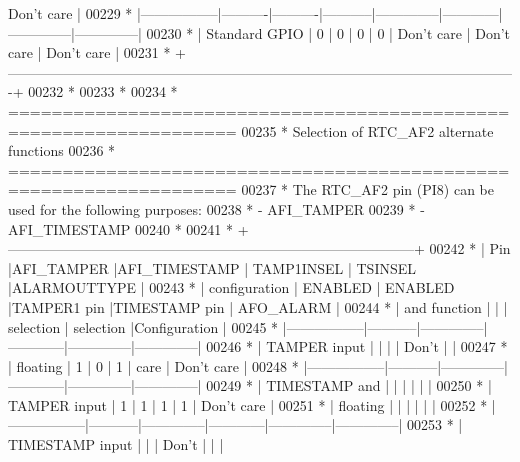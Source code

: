 \begin{DoxyCode}
{       Don't care  |}
00229 \textcolor{comment}{  *
       |-----------------|----------|----------|-----------|--------------|------------|--------------|--------------|}
00230 \textcolor{comment}{  * |  Standard GPIO  |     0    |    0     |     0     |      0       | Don't care |  Don't care  | 
       Don't care  |}
00231 \textcolor{comment}{  *
       +-------------------------------------------------------------------------------------------------------------+}
00232 \textcolor{comment}{  *}
00233 \textcolor{comment}{  *}
00234 \textcolor{comment}{  *          ===================================================================}
00235 \textcolor{comment}{  *                            Selection of RTC\_AF2 alternate functions}
00236 \textcolor{comment}{  *          ===================================================================}
00237 \textcolor{comment}{  *          The RTC\_AF2 pin (PI8) can be used for the following purposes:}
00238 \textcolor{comment}{  *            - AFI\_TAMPER}
00239 \textcolor{comment}{  *            - AFI\_TIMESTAMP}
00240 \textcolor{comment}{  *}
00241 \textcolor{comment}{  * +---------------------------------------------------------------------------------------+}
00242 \textcolor{comment}{  * |     Pin         |AFI\_TAMPER |AFI\_TIMESTAMP | TAMP1INSEL |   TSINSEL    |ALARMOUTTYPE  |}
00243 \textcolor{comment}{  * |  configuration  |  ENABLED  |   ENABLED    |TAMPER1 pin |TIMESTAMP pin |  AFO\_ALARM   |}
00244 \textcolor{comment}{  * |  and function   |           |              | selection  |  selection   |Configuration |}
00245 \textcolor{comment}{  * |-----------------|-----------|--------------|------------|--------------|--------------|}
00246 \textcolor{comment}{  * |  TAMPER input   |           |              |            |     Don't    |              |}
00247 \textcolor{comment}{  * |   floating      |     1     |      0       |      1     |     care     |  Don't care  |}
00248 \textcolor{comment}{  * |-----------------|-----------|--------------|------------|--------------|--------------|}
00249 \textcolor{comment}{  * |  TIMESTAMP and  |           |              |            |              |              |}
00250 \textcolor{comment}{  * |  TAMPER input   |     1     |      1       |      1     |      1       |  Don't care  |}
00251 \textcolor{comment}{  * |   floating      |           |              |            |              |              |}
00252 \textcolor{comment}{  * |-----------------|-----------|--------------|------------|--------------|--------------|}
00253 \textcolor{comment}{  * | TIMESTAMP input |           |              |    Don't   |              |              |}

\end{DoxyCode}
